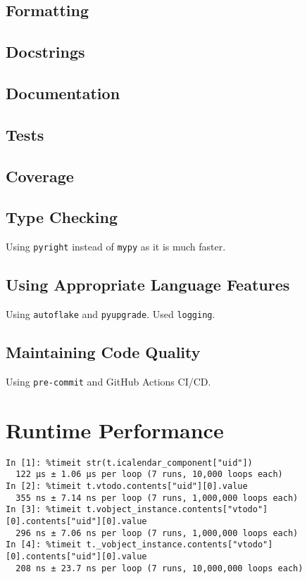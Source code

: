 \documentclass{prettytex/ox/mmsc-special-topic}
\begin{document}
  \subsection{Formatting}
  \subsection{Docstrings}
  \subsection{Documentation}
  \subsection{Tests}
  \subsection{Coverage}
  \subsection{Type Checking}
  Using \texttt{pyright} instead of \texttt{mypy} as it is much faster.
  \subsection{Using Appropriate Language Features}
  Using \texttt{autoflake} and \texttt{pyupgrade}.
  Used \texttt{logging}.
  \subsection{Maintaining Code Quality}
  Using \texttt{pre-commit} and GitHub Actions CI/CD.

  \section{Runtime Performance}
  \begin{verbatim}
In [1]: %timeit str(t.icalendar_component["uid"])
  122 µs ± 1.06 µs per loop (7 runs, 10,000 loops each)
In [2]: %timeit t.vtodo.contents["uid"][0].value
  355 ns ± 7.14 ns per loop (7 runs, 1,000,000 loops each)
In [3]: %timeit t.vobject_instance.contents["vtodo"][0].contents["uid"][0].value
  296 ns ± 7.06 ns per loop (7 runs, 1,000,000 loops each)
In [4]: %timeit t._vobject_instance.contents["vtodo"][0].contents["uid"][0].value
  208 ns ± 23.7 ns per loop (7 runs, 10,000,000 loops each)
  \end{verbatim}
\end{document}
